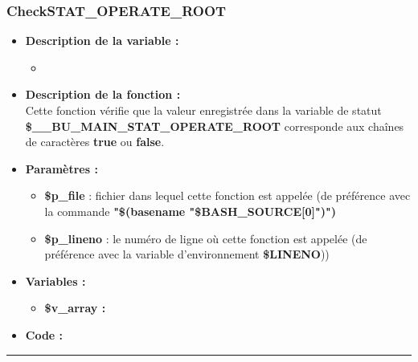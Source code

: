 \documentclass[a4paper,10pt]{article}
\begin{document}
\color{blue}
\subsubsection{CheckSTAT\_OPERATE\_ROOT}\color{white}
\begin{itemize}
    \item \textbf{Description de la variable :}
    \begin{itemize}
        \item \textbf{}\\[1\baselineskip]
    \end{itemize}


    \item \textbf{Description de la fonction :}\\
        Cette fonction vérifie que la valeur enregistrée dans la variable de statut\\ \textbf{\color{orange}\$\_\_BU\_MAIN\_STAT\_OPERATE\_ROOT} corresponde aux chaînes de caractères \textbf{true} ou \textbf{false}.\\[1\baselineskip]

    \item \textbf{Paramètres :}
    \begin{itemize}
        \item \color{orange}\textbf{\$p\_file}\color{white} : fichier dans lequel cette fonction est appelée (de préférence avec la commande \textbf{"\$(\color{gray}basename \color{white}"\color{orange}\$BASH\_SOURCE[0]\color{white}")")}\\[1\baselineskip]

        \item \color{orange}\textbf{\$p\_lineno}\color{white} : le numéro de ligne où cette fonction est appelée (de préférence avec la variable d'environnement \textbf{\color{orange}\$LINENO}))\\[1\baselineskip]
    \end{itemize}

    \item \textbf{Variables :}
    \begin{itemize}
        \item \textbf{\color{orange}\$v\_array\color{white} :}\\[1\baselineskip]
    \end{itemize}


    \item \textbf{Code :}
\end{itemize}


\color{blue}\par\noindent\rule{\textwidth}{0.4pt}\color{white}
\end{document}
